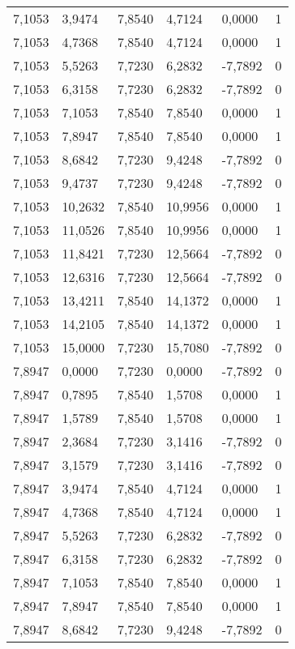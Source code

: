 \begin{longtable}{@{}llllll@{}}
		7,1053  & 3,9474  & 7,8540  & 4,7124  & 0,0000   & 1  \\
		7,1053  & 4,7368  & 7,8540  & 4,7124  & 0,0000   & 1  \\
		7,1053  & 5,5263  & 7,7230  & 6,2832  & -7,7892  & 0  \\
		7,1053  & 6,3158  & 7,7230  & 6,2832  & -7,7892  & 0  \\
		7,1053  & 7,1053  & 7,8540  & 7,8540  & 0,0000   & 1  \\
		7,1053  & 7,8947  & 7,8540  & 7,8540  & 0,0000   & 1  \\
		7,1053  & 8,6842  & 7,7230  & 9,4248  & -7,7892  & 0  \\
		7,1053  & 9,4737  & 7,7230  & 9,4248  & -7,7892  & 0  \\
		7,1053  & 10,2632 & 7,8540  & 10,9956 & 0,0000   & 1  \\
		7,1053  & 11,0526 & 7,8540  & 10,9956 & 0,0000   & 1  \\
		7,1053  & 11,8421 & 7,7230  & 12,5664 & -7,7892  & 0  \\
		7,1053  & 12,6316 & 7,7230  & 12,5664 & -7,7892  & 0  \\
		7,1053  & 13,4211 & 7,8540  & 14,1372 & 0,0000   & 1  \\
		7,1053  & 14,2105 & 7,8540  & 14,1372 & 0,0000   & 1  \\
		7,1053  & 15,0000 & 7,7230  & 15,7080 & -7,7892  & 0  \\
		7,8947  & 0,0000  & 7,7230  & 0,0000  & -7,7892  & 0  \\
		7,8947  & 0,7895  & 7,8540  & 1,5708  & 0,0000   & 1  \\
		7,8947  & 1,5789  & 7,8540  & 1,5708  & 0,0000   & 1  \\
		7,8947  & 2,3684  & 7,7230  & 3,1416  & -7,7892  & 0  \\
		7,8947  & 3,1579  & 7,7230  & 3,1416  & -7,7892  & 0  \\
		7,8947  & 3,9474  & 7,8540  & 4,7124  & 0,0000   & 1  \\
		7,8947  & 4,7368  & 7,8540  & 4,7124  & 0,0000   & 1  \\
		7,8947  & 5,5263  & 7,7230  & 6,2832  & -7,7892  & 0  \\
		7,8947  & 6,3158  & 7,7230  & 6,2832  & -7,7892  & 0  \\
		7,8947  & 7,1053  & 7,8540  & 7,8540  & 0,0000   & 1  \\
		7,8947  & 7,8947  & 7,8540  & 7,8540  & 0,0000   & 1  \\
		7,8947  & 8,6842  & 7,7230  & 9,4248  & -7,7892  & 0  \\

\end{longtable}
